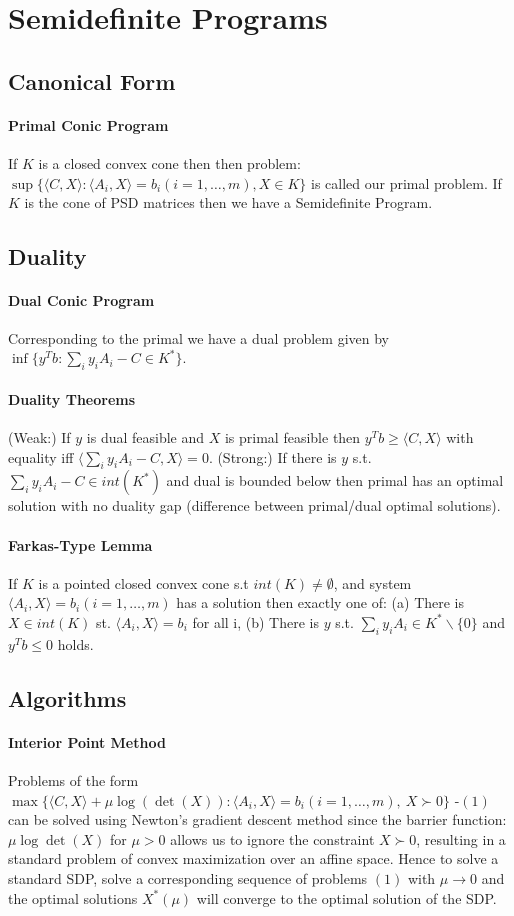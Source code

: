 \documentclass[letterpaper,11pt,oneside,onecolumn]{article}
\begin{document}
\section*{Semidefinite Programs}
\subsection*{Canonical Form}
\paragraph{Primal Conic Program} If $K$ is a closed convex cone then then problem:
$\sup \{\langle C, X \rangle : \langle A_i, X \rangle = b_i (i=1,\dots, m), X \in K \} $ is called our primal problem. If $K$ is the cone of PSD matrices then we have a Semidefinite Program.
\subsection*{Duality}
\paragraph{Dual Conic Program} Corresponding to the primal we have a dual problem given by $\inf \{ y^Tb : \sum_i y_iA_i - C \in K^*\}.$
\paragraph{Duality Theorems} (Weak:) If $y$ is dual feasible and $X$ is primal feasible then $y^Tb \geq \langle C, X\rangle$ with equality iff $\langle \sum_i y_i A_i - C, X\rangle = 0$. (Strong:) If there is $y$ s.t. $\sum_i y_i A_i - C \in int(K^*)$ and dual is bounded below then primal has an optimal solution with no duality gap (difference between primal/dual optimal solutions).
\paragraph{Farkas-Type Lemma} If $K$ is a pointed closed convex cone s.t $int(K) \neq \emptyset$, and system $\langle A_i, X \rangle = b_i (i=1,\dots,m)$ has a solution then exactly one of: (a) There is $X \in int (K)$ st. $\langle A_i, X\rangle = b_i$ for all i, (b) There is $y$ s.t. $\sum_i y_i A_i \in K^*\backslash \{0\}$ and $y^Tb \leq 0$ holds.
\subsection*{Algorithms}
\paragraph{Interior Point Method} Problems of the form $\max\{\langle C, X\rangle + \mu \log(\det(X)) : \langle A_i, X\rangle = b_i (i=1,\dots,m),\ X\succ 0 \}$ -$(1)$ can be solved using Newton's gradient descent method since the barrier function: $\mu \log\det(X)$ for $\mu > 0$ allows us to ignore the constraint $X \succ 0$, resulting in a standard problem of convex maximization over an affine space. Hence to solve a standard SDP, solve a corresponding sequence of problems $(1)$ with $\mu \rightarrow 0$ and the optimal solutions $X^*(\mu)$ will converge to the optimal solution of the SDP.
\end{document}
